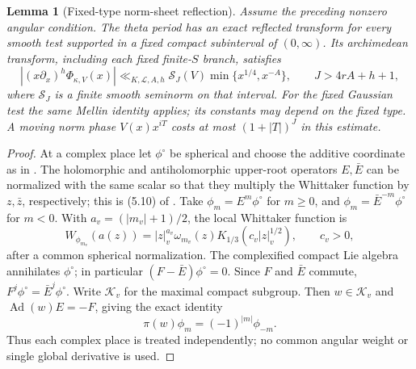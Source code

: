 \documentclass[11pt,a4paper]{article}
\newtheorem{lemma}[theorem]{Lemma}
\theoremstyle{remark}\newtheorem{remark}[theorem]{Remark}
\numberwithin{equation}{section}
\begin{document}
\begin{lemma}[Fixed-type norm-sheet reflection]\label{lem-general-arch}
Assume the preceding nonzero angular condition.  The theta period has
an exact reflected transform for every smooth test supported in a
fixed compact subinterval of $(0,\infty)$.  Its archimedean transform,
including each fixed finite-$S$ branch, satisfies
\[
 |(x\partial_x)^h\Phi_{\kappa,V}(x)|
 \ll_{K,\mathscr L,A,h}\mathcal S_J(V)
       \min\{x^{1/4},x^{-A}\},
 \qquad J>4rA+h+1,
\]
where $\mathcal S_J$ is a finite smooth seminorm on that interval.
For the fixed Gaussian test the same Mellin identity applies;
its constants may depend on the fixed type.  A moving norm phase $V(x)x^{iT}$
costs at most $(1+|T|)^J$ in this estimate.
\end{lemma}

\begin{proof}
At a complex place let $\phi^\circ$ be spherical and choose the
additive coordinate as in \cite[Section 5.2]{P}.  The holomorphic
and antiholomorphic upper-root operators $E,\bar E$ can be normalized
with the same scalar so that they multiply the Whittaker function
by $z,\bar z$, respectively; this is (5.10) of \cite{P}.
Take $\phi_m=E^m\phi^\circ$ for $m\ge0$, and
$\phi_m=\bar E^{-m}\phi^\circ$ for $m<0$.
With $a_v=(|m_v|+1)/2$, the local Whittaker function is
\[
 W_{\phi_{m_v}}(a(z))
   =|z|_v^{a_v}\omega_{m_v}(z)
     K_{1/3}(c_v|z|_v^{1/2}),\qquad c_v>0,
\]
after a common spherical normalization.
The complexified compact Lie algebra annihilates $\phi^\circ$;
in particular $(F-\bar E)\phi^\circ=0$.
Since $F$ and $\bar E$ commute, $F^j\phi^\circ=\bar E^j\phi^\circ$.
Write $\mathcal K_v$ for the maximal compact subgroup. Then
$w\in\mathcal K_v$ and $\operatorname{Ad}(w)E=-F$, giving the exact identity
\[
                    \pi(w)\phi_m=(-1)^{|m|}\phi_{-m}.
\]
Thus each complex place is treated independently; no common angular
weight or single global derivative is used.


\end{proof}
\end{document}
